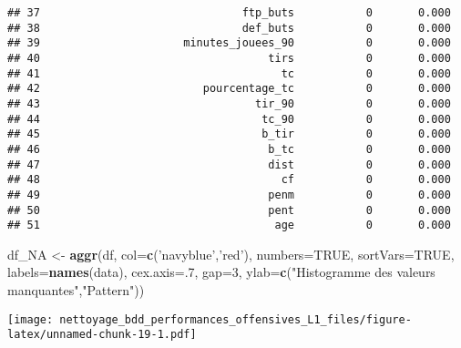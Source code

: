 \documentclass[7pt,]{report}
\newenvironment{Shaded}{\begin{snugshade}}{\end{snugshade}}
\newcommand{\DataTypeTok}[1]{\textcolor[rgb]{0.13,0.29,0.53}{#1}}
\newcommand{\DecValTok}[1]{\textcolor[rgb]{0.00,0.00,0.81}{#1}}
\newcommand{\KeywordTok}[1]{\textcolor[rgb]{0.13,0.29,0.53}{\textbf{#1}}}
\newcommand{\NormalTok}[1]{#1}
\newcommand{\OtherTok}[1]{\textcolor[rgb]{0.56,0.35,0.01}{#1}}
\newcommand{\StringTok}[1]{\textcolor[rgb]{0.31,0.60,0.02}{#1}}
\begin{document}
\begin{verbatim}
## 37                               ftp_buts           0       0.000
## 38                               def_buts           0       0.000
## 39                      minutes_jouees_90           0       0.000
## 40                                   tirs           0       0.000
## 41                                     tc           0       0.000
## 42                         pourcentage_tc           0       0.000
## 43                                 tir_90           0       0.000
## 44                                  tc_90           0       0.000
## 45                                  b_tir           0       0.000
## 46                                   b_tc           0       0.000
## 47                                   dist           0       0.000
## 48                                     cf           0       0.000
## 49                                   penm           0       0.000
## 50                                   pent           0       0.000
## 51                                    age           0       0.000
\end{verbatim}

\begin{Shaded}
\begin{Highlighting}[]
\NormalTok{df_NA <-}\StringTok{ }\KeywordTok{aggr}\NormalTok{(df,}
              \DataTypeTok{col=}\KeywordTok{c}\NormalTok{(}\StringTok{'navyblue'}\NormalTok{,}\StringTok{'red'}\NormalTok{),}
              \DataTypeTok{numbers=}\OtherTok{TRUE}\NormalTok{,}
              \DataTypeTok{sortVars=}\OtherTok{TRUE}\NormalTok{,}
              \DataTypeTok{labels=}\KeywordTok{names}\NormalTok{(data),}
              \DataTypeTok{cex.axis=}\NormalTok{.}\DecValTok{7}\NormalTok{, }\DataTypeTok{gap=}\DecValTok{3}\NormalTok{,}
              \DataTypeTok{ylab=}\KeywordTok{c}\NormalTok{(}\StringTok{"Histogramme des valeurs manquantes"}\NormalTok{,}\StringTok{"Pattern"}\NormalTok{))}
\end{Highlighting}
\end{Shaded}

\texttt{[image: nettoyage\_bdd\_performances\_offensives\_L1\_files/figure-latex/unnamed-chunk-19-1.pdf]}
\end{document}
